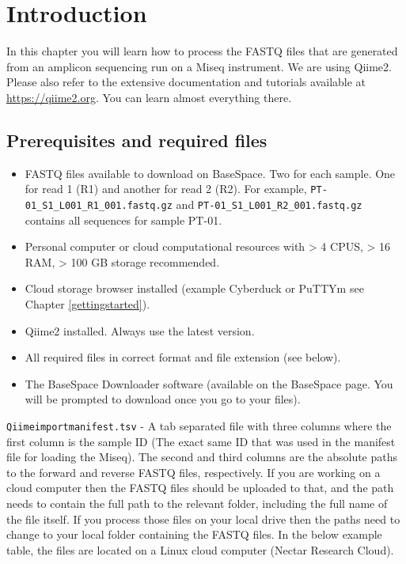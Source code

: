\documentclass[
]{book}
\providecommand{\tightlist}{%
  \setlength{\itemsep}{0pt}\setlength{\parskip}{0pt}}
\begin{document}
\hypertarget{introduction-1}{%
\section{Introduction}\label{introduction-1}}

In this chapter you will learn how to process the FASTQ files that are generated from an amplicon sequencing run on a Miseq instrument. We are using Qiime2. Please also refer to the extensive documentation and tutorials available at \url{https://qiime2.org}. You can learn almost everything there.

\hypertarget{prerequisites-and-required-files}{%
\subsection{Prerequisites and required files}\label{prerequisites-and-required-files}}

\begin{itemize}
\tightlist
\item
  FASTQ files available to download on BaseSpace. Two for each sample. One for read 1 (R1) and another for read 2 (R2). For example, \texttt{PT-01\_S1\_L001\_R1\_001.fastq.gz} and \texttt{PT-01\_S1\_L001\_R2\_001.fastq.gz} contains all sequences for sample PT-01.
\item
  Personal computer or cloud computational resources with \textgreater{} 4 CPUS, \textgreater{} 16 RAM, \textgreater{} 100 GB storage recommended.\\
\item
  Cloud storage browser installed (example Cyberduck or PuTTYm see Chapter \ref{gettingstarted}).\\
\item
  Qiime2 installed. Always use the latest version.\\
\item
  All required files in correct format and file extension (see below).\\
\item
  The BaseSpace Downloader software (available on the BaseSpace page. You will be prompted to download once you go to your files).
\end{itemize}

\texttt{Qiimeimportmanifest.tsv} - A tab separated file with three columns where the first column is the sample ID (The exact same ID that was used in the manifest file for loading the Miseq). The second and third columns are the absolute paths to the forward and reverse FASTQ files, respectively. If you are working on a cloud computer then the FASTQ files should be uploaded to that, and the path needs to contain the full path to the relevant folder, including the full name of the file itself. If you process those files on your local drive then the paths need to change to your local folder containing the FASTQ files. In the below example table, the files are located on a Linux cloud computer (Nectar Research Cloud).
\end{document}
